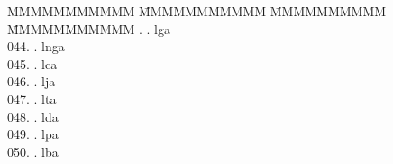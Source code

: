 \begin{tabbing}
MMMMMMMMMMM \=MMMMMMMMMMM \=MMMMMMMMMM \= MMMMMMMMMMM .	. 	\> lga 	\> \bgroup\tibetan \def\u#1{\vtop{\baselineskip0pt\hbox{#1}\hbox{\tibsp\char123}}}\parindent=0pt \newbox\fillerbox\setbox\fillerbox\hbox{\vrule height0.4cm depth0.4cm width0pt}\def\filler{\copy\fillerbox}\filler\tibsp{}\tenrm\ \tibetan
\egroup  \\
044.	. 	\> lnga 	\> \bgroup\tibetan \def\u#1{\vtop{\baselineskip0pt\hbox{#1}\hbox{\tibsp\char123}}}\parindent=0pt \newbox\fillerbox\setbox\fillerbox\hbox{\vrule height0.4cm depth0.4cm width0pt}\def\filler{\copy\fillerbox}\filler\tibsp{}\tenrm\ \tibetan
\egroup  \\
045.	. 	\> lca 	\> \bgroup\tibetan \def\u#1{\vtop{\baselineskip0pt\hbox{#1}\hbox{\tibsp\char123}}}\parindent=0pt \newbox\fillerbox\setbox\fillerbox\hbox{\vrule height0.4cm depth0.4cm width0pt}\def\filler{\copy\fillerbox}\filler\tibsp{}\tenrm\ \tibetan
\egroup  \\
046.	. 	\> lja 	\> \bgroup\tibetan \def\u#1{\vtop{\baselineskip0pt\hbox{#1}\hbox{\tibsp\char123}}}\parindent=0pt \newbox\fillerbox\setbox\fillerbox\hbox{\vrule height0.4cm depth0.4cm width0pt}\def\filler{\copy\fillerbox}\filler\tibsp{}\tenrm\ \tibetan
\egroup  \\
047.	. 	\> lta 	\> \bgroup\tibetan \def\u#1{\vtop{\baselineskip0pt\hbox{#1}\hbox{\tibsp\char123}}}\parindent=0pt \newbox\fillerbox\setbox\fillerbox\hbox{\vrule height0.4cm depth0.4cm width0pt}\def\filler{\copy\fillerbox}\filler\tibsp{}\tenrm\ \tibetan
\egroup  \\
048.	. 	\> lda 	\> \bgroup\tibetan \def\u#1{\vtop{\baselineskip0pt\hbox{#1}\hbox{\tibsp\char123}}}\parindent=0pt \newbox\fillerbox\setbox\fillerbox\hbox{\vrule height0.4cm depth0.4cm width0pt}\def\filler{\copy\fillerbox}\filler\tibsp{}\tenrm\ \tibetan
\egroup  \\
049.	. 	\> lpa 	\> \bgroup\tibetan \def\u#1{\vtop{\baselineskip0pt\hbox{#1}\hbox{\tibsp\char123}}}\parindent=0pt \newbox\fillerbox\setbox\fillerbox\hbox{\vrule height0.4cm depth0.4cm width0pt}\def\filler{\copy\fillerbox}\filler\tibsp{}\tenrm\ \tibetan
\egroup  \\
050.	. 	\> lba 	\> \bgroup\tibetan \def\u#1{\vtop{\baselineskip0pt\hbox{#1}\hbox{\tibsp\char123}}}\parindent=0pt \newbox\fillerbox\setbox\fillerbox\hbox{\vrule height0.4cm depth0.4cm width0pt}\def\filler{\copy\fillerbox}\filler\tibsp{}\tenrm\ \tibetan

\end{tabbing}
